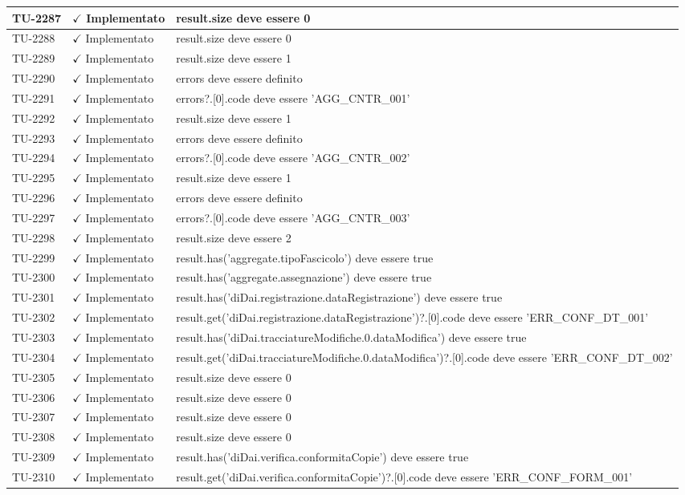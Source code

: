 ﻿\documentclass[a4paper,12pt]{article}
\newcommand{\ok}{\textcolor{green!60!black}{$\checkmark$ Implementato}}
\begin{document}
\begin{longtable}{|p{2cm}|p{3.5cm}|p{9.5cm}|}
\hline
TU-2287 & \ok & result.size deve essere 0 \\
\hline
TU-2288 & \ok & result.size deve essere 0 \\
\hline
TU-2289 & \ok & result.size deve essere 1 \\
\hline
TU-2290 & \ok & errors deve essere definito \\
\hline
TU-2291 & \ok & errors?.[0].code deve essere 'AGG\_CNTR\_001' \\
\hline
TU-2292 & \ok & result.size deve essere 1 \\
\hline
TU-2293 & \ok & errors deve essere definito \\
\hline
TU-2294 & \ok & errors?.[0].code deve essere 'AGG\_CNTR\_002' \\
\hline
TU-2295 & \ok & result.size deve essere 1 \\
\hline
TU-2296 & \ok & errors deve essere definito \\
\hline
TU-2297 & \ok & errors?.[0].code deve essere 'AGG\_CNTR\_003' \\
\hline
TU-2298 & \ok & result.size deve essere 2 \\
\hline
TU-2299 & \ok & result.has('aggregate.tipoFascicolo') deve essere true \\
\hline
TU-2300 & \ok & result.has('aggregate.assegnazione') deve essere true \\
\hline
TU-2301 & \ok & result.has('diDai.registrazione.dataRegistrazione') deve essere true \\
\hline
TU-2302 & \ok & result.get('diDai.registrazione.dataRegistrazione')?.[0].code deve essere 'ERR\_CONF\_DT\_001' \\
\hline
TU-2303 & \ok & result.has('diDai.tracciatureModifiche.0.dataModifica') deve essere true \\
\hline
TU-2304 & \ok & result.get('diDai.tracciatureModifiche.0.dataModifica')?.[0].code deve essere 'ERR\_CONF\_DT\_002' \\
\hline
TU-2305 & \ok & result.size deve essere 0 \\
\hline
TU-2306 & \ok & result.size deve essere 0 \\
\hline
TU-2307 & \ok & result.size deve essere 0 \\
\hline
TU-2308 & \ok & result.size deve essere 0 \\
\hline
TU-2309 & \ok & result.has('diDai.verifica.conformitaCopie') deve essere true \\
\hline
TU-2310 & \ok & result.get('diDai.verifica.conformitaCopie')?.[0].code deve essere 'ERR\_CONF\_FORM\_001' \\

\end{longtable}
\end{document}
